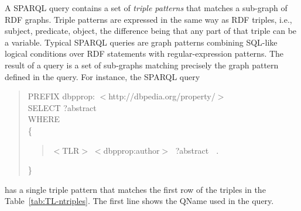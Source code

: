 A SPARQL query contains a set of \emph{triple patterns} that matches a
sub-graph of RDF graphs. Triple patterns are expressed in the same way as RDF
triples, i.e., subject, predicate, object, the difference being that any part of
that triple can be a variable. Typical SPARQL queries are graph patterns
combining SQL-like logical conditions over RDF statements with
regular-expression patterns. The result of a query is a set of sub-graphs
matching precisely the graph pattern defined in the query. For instance, the
SPARQL query
\begin{quote}
\begin{flushleft}
PREFIX dbpprop:    $<$http://dbpedia.org/property/$>$\\
SELECT ?abstract\\
WHERE\\
\{\\
\begin{quote}
$<$TLR$> \; <$dbpprop:author$> \;$ ?abstract $\;$ . 
\end{quote}
\}
\end{flushleft}
\end{quote}
has a single triple pattern that matches the first row of the triples in the
Table~\ref{tab:TL-ntriples}. The first line shows the QName used in the query.

% 
% 
